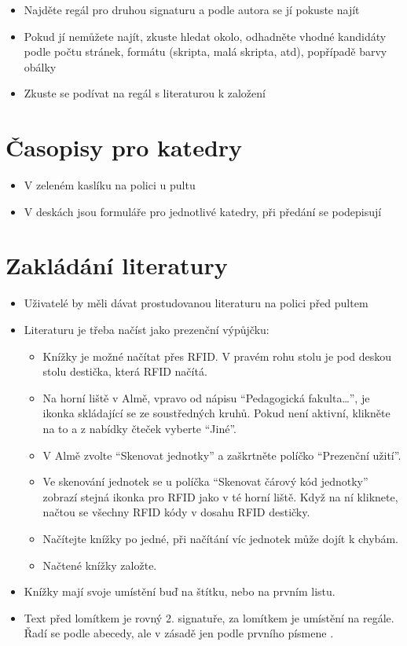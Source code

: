\documentclass{article}
\begin{document}
\begin{itemize}
  \item Najděte regál pro druhou signaturu a podle autora se jí pokuste najít
  \item Pokud jí nemůžete najít, zkuste hledat okolo, odhadněte vhodné kandidáty podle počtu
    stránek, formátu (skripta, malá skripta, atd), popřípadě barvy obálky
  \item Zkuste se podívat na regál s literaturou k založení
\end{itemize}

\section{Časopisy pro katedry}
\begin{itemize}
  \item V zeleném kaslíku na polici u pultu
  \item  V deskách jsou formuláře pro jednotlivé katedry, při předání se podepisují
\end{itemize}

\section{Zakládání literatury}

\begin{itemize}
\item  Uživatelé by měli dávat prostudovanou literaturu na polici před pultem
\item  Literaturu je třeba načíst jako prezenční výpůjčku:
  \begin{itemize}
    \item  Knížky je možné načítat přes RFID. V pravém rohu stolu je pod deskou stolu destička, která RFID načítá.
    \item Na horní liště v Almě, vpravo od nápisu \enquote{Pedagogická fakulta\ldots}, je ikonka skládající se ze soustředných kruhů. Pokud není aktivní, klikněte na to a z nabídky čteček vyberte \enquote{Jiné}.
    \item  V Almě zvolte \enquote{Skenovat jednotky} a zaškrtněte políčko \enquote{Prezenční užití}.
    \item Ve skenování jednotek se u políčka \enquote{Skenovat čárový kód jednotky} zobrazí stejná ikonka pro RFID jako v té horní liště. Když na ní kliknete, načtou se všechny RFID kódy v dosahu RFID destičky.
    \item Načítejte knížky po jedné, při načítání víc jednotek může dojít k chybám.
    \item Načtené knížky založte.
  \end{itemize}
\item Knížky mají svoje umístění buď na štítku, nebo na prvním listu.
\item Text před lomítkem je rovný 2. signatuře, za lomítkem je umístění na regále. Řadí se podle abecedy, ale v zásadě jen podle prvního písmene .
\end{itemize}
\end{document}
